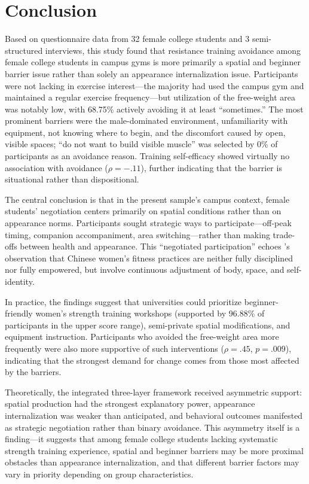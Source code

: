 \section{Conclusion}

Based on questionnaire data from 32 female college students and 3 semi-structured interviews, this study found that resistance training avoidance among female college students in campus gyms is more primarily a spatial and beginner barrier issue rather than solely an appearance internalization issue.
Participants were not lacking in exercise interest---the majority had used the campus gym and maintained a regular exercise frequency---but utilization of the free-weight area was notably low, with 68.75\% actively avoiding it at least ``sometimes.''
The most prominent barriers were the male-dominated environment, unfamiliarity with equipment, not knowing where to begin, and the discomfort caused by open, visible spaces; ``do not want to build visible muscle'' was selected by 0\% of participants as an avoidance reason.
Training self-efficacy showed virtually no association with avoidance ($\rho = -.11$), further indicating that the barrier is situational rather than dispositional.

The central conclusion is that in the present sample's campus context, female students' negotiation centers primarily on spatial conditions rather than on appearance norms.
Participants sought strategic ways to participate---off-peak timing, companion accompaniment, area switching---rather than making trade-offs between health and appearance.
This ``negotiated participation'' echoes \textcite{xiong2021fanshen}'s observation that Chinese women's fitness practices are neither fully disciplined nor fully empowered, but involve continuous adjustment of body, space, and self-identity.

In practice, the findings suggest that universities could prioritize beginner-friendly women's strength training workshops (supported by 96.88\% of participants in the upper score range), semi-private spatial modifications, and equipment instruction.
Participants who avoided the free-weight area more frequently were also more supportive of such interventions ($\rho = .45$, $p = .009$), indicating that the strongest demand for change comes from those most affected by the barriers.

Theoretically, the integrated three-layer framework received asymmetric support: spatial production had the strongest explanatory power, appearance internalization was weaker than anticipated, and behavioral outcomes manifested as strategic negotiation rather than binary avoidance.
This asymmetry itself is a finding---it suggests that among female college students lacking systematic strength training experience, spatial and beginner barriers may be more proximal obstacles than appearance internalization, and that different barrier factors may vary in priority depending on group characteristics.

